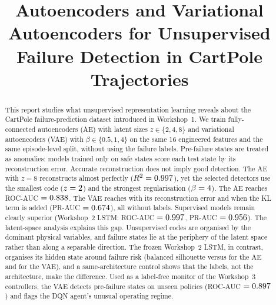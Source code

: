 \documentclass[conference]{IEEEtran}
\begin{document}
\title{Autoencoders and Variational Autoencoders for Unsupervised Failure Detection in CartPole Trajectories}

\author{
\and
{}
\and
{}
}

\maketitle

\begin{abstract}
This report studies what unsupervised representation learning reveals about the CartPole
failure-prediction dataset introduced in Workshop~1. We train fully-connected
autoencoders (AE) with latent sizes $z\in\{2,4,8\}$ and variational autoencoders (VAE)
with $\beta\in\{0.5,1,4\}$ on the same 16 engineered features and the same episode-level
split, without using the failure labels. Pre-failure states are treated as anomalies:
models trained only on safe states score each test state by its reconstruction error.
Accurate reconstruction does not imply good detection. The AE with $z=8$ reconstructs
almost perfectly ($R^2=0.997$), yet the selected detectors use the smallest code
($z=2$) and the strongest regularisation ($\beta=4$). The AE reaches ROC-AUC
$=0.838$. The VAE reaches \vaeAUC{} with its reconstruction error and \vaeklAUC{} when the KL
term is added (PR-AUC $=0.674$), all without labels. Supervised models remain clearly
superior (Workshop~2 LSTM: ROC-AUC $=0.997$, PR-AUC $=0.956$). The latent-space analysis
explains this gap. Unsupervised codes are organised by the dominant physical variables, and
failure states lie at the periphery of the latent space rather than along a separable
direction. The frozen Workshop~2 LSTM, in contrast, organises its hidden state around
failure risk (balanced silhouette \silSup{} versus \silAE{} for the AE and \silVAE{} for
the VAE), and a same-architecture control shows that the labels, not the architecture, make
the difference. Used as a label-free monitor of the Workshop~3 controllers, the VAE detects
pre-failure states on unseen policies (ROC-AUC $=0.897$) and flags the DQN agent's
unusual operating regime.
\end{abstract}
\end{document}
